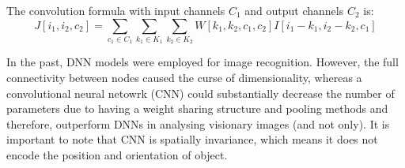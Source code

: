The convolution formula with input channels $C_1$ and output channels $C_2$ is:
\begin{equation}
    J[i_1,i_2,c_2] = \sum_{c_1 \in C_1}\sum_{k_1 \in K_1}\sum_{k_2 \in K_2}{W[k_1, k_2, c_1, c_2]I[i_1 - k_1, i_2 - k_2, c_1]}
\end{equation}

In the past, DNN models were employed for image recognition. However, the full connectivity between nodes caused the
curse of dimensionality, whereas a convolutional neural netowrk (CNN) could substantially decrease the number of parameters due to
having a weight sharing structure and pooling methods
and therefore, outperform DNNs in analysing visionary
images (and not only). It is important to note that CNN is spatially
invariance, which means it does not encode the position
and orientation of object.



